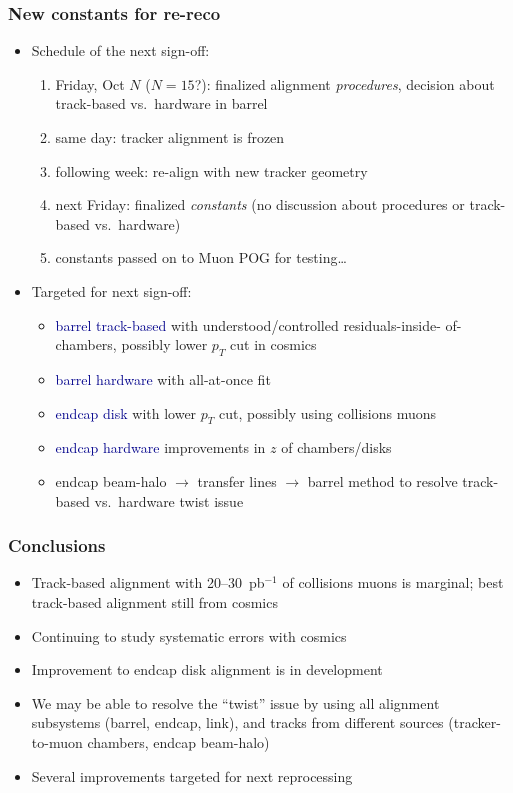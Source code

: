 \documentclass[compress]{beamer}
\begin{document}
\begin{frame}
\frametitle{New constants for re-reco}
\begin{itemize}
\item Schedule of the next sign-off:
\begin{enumerate}
\item Friday, Oct $N$ ($N = 15$?): finalized alignment {\it procedures}, decision about track-based vs.\ hardware in barrel
\item same day: tracker alignment is frozen
\item following week: re-align with new tracker geometry
\item next Friday: finalized {\it constants} (no discussion about procedures or track-based vs.\ hardware)
\item constants passed on to Muon POG for testing\ldots
\end{enumerate}

\item Targeted for next sign-off:
\begin{itemize}
\item \textcolor{darkblue}{barrel track-based} with understood/controlled residuals-inside- of-chambers, possibly lower $p_T$ cut in cosmics
\item \textcolor{darkblue}{barrel hardware} with all-at-once fit
\item \textcolor{darkblue}{endcap disk} with lower $p_T$ cut, possibly using collisions muons
\item \textcolor{darkblue}{endcap hardware} improvements in $z$ of chambers/disks
\item endcap beam-halo $\to$ transfer lines $\to$ barrel method to resolve track-based vs.\ hardware twist issue
\end{itemize}
\end{itemize}
\end{frame}

\begin{frame}
\frametitle{Conclusions}
\begin{itemize}\setlength{\itemsep}{0.25 cm}
\item Track-based alignment with 20--30~pb$^{-1}$ of collisions muons
  is marginal; best track-based alignment still from cosmics
\item Continuing to study systematic errors with cosmics
\item Improvement to endcap disk alignment is in development
\item We may be able to resolve the ``twist'' issue by using all
  alignment subsystems (barrel, endcap, link), and tracks from
  different sources (tracker-to-muon chambers, endcap beam-halo)
\item Several improvements targeted for next reprocessing
\end{itemize}
\label{numpages}
\end{frame}
\end{document}
